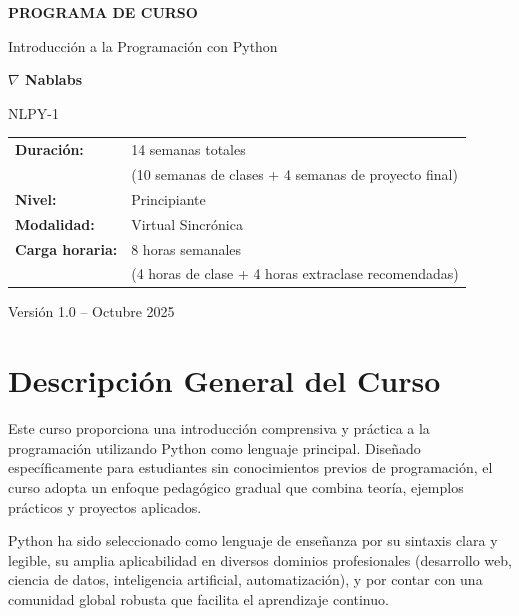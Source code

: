 \documentclass[12pt,letterpaper]{article}
\begin{document}
\begin{titlepage}
    \centering
    \vspace*{2cm}
    
    {\Huge\bfseries\textcolor{nablabrownmain}{PROGRAMA DE CURSO}\par}
    \vspace{1cm}
    {\LARGE\textcolor{nablabrowndark}{Introducción a la Programación con Python}\par}
    \vspace{2cm}
    
    {\Large\textbf{$\nabla$ Nablabs}\par}
    \vspace{1cm}
    
    {\large NLPY-1\par}
    \vspace{2cm}
    
    \begin{tabular}{ll}
        \textbf{Duración:} & 14 semanas totales \\
        & (10 semanas de clases + 4 semanas de proyecto final) \\
        \textbf{Nivel:} & Principiante \\
        \textbf{Modalidad:} & Virtual Sincrónica \\
        \textbf{Carga horaria:} & 8 horas semanales \\
        & (4 horas de clase + 4 horas extraclase recomendadas) \\
    \end{tabular}
    
    \vfill
    {\large Versión 1.0 -- Octubre 2025\par}
\end{titlepage}

\tableofcontents
\newpage

\section{Descripción General del Curso}

Este curso proporciona una introducción comprensiva y práctica a la programación utilizando Python como lenguaje principal. Diseñado específicamente para estudiantes sin conocimientos previos de programación, el curso adopta un enfoque pedagógico gradual que combina teoría, ejemplos prácticos y proyectos aplicados.

Python ha sido seleccionado como lenguaje de enseñanza por su sintaxis clara y legible, su amplia aplicabilidad en diversos dominios profesionales (desarrollo web, ciencia de datos, inteligencia artificial, automatización), y por contar con una comunidad global robusta que facilita el aprendizaje continuo.
\end{document}

